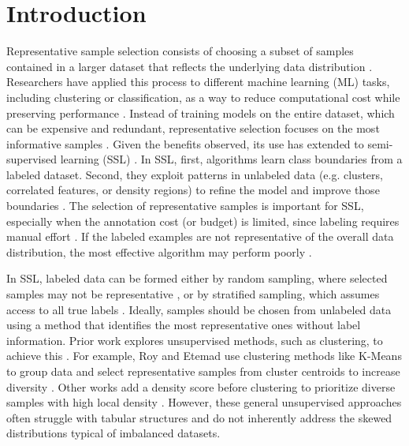 \documentclass[preprint,12pt]{elsarticle}
\begin{document}


\section{Introduction}

Representative sample selection consists of choosing a subset of samples contained in a larger dataset that reflects the underlying data distribution \cite{liebman2015representative}. Researchers have applied this process to different machine learning (ML) tasks, including clustering or classification, as a way to reduce computational cost while preserving performance \cite{olvera2010review,chen2025fpsmix}. Instead of training models on the entire dataset, which can be expensive and redundant, representative selection focuses on the most informative samples \cite{olvera2010review}. Given the benefits observed, its use has extended to semi-supervised learning (SSL) \cite{wang2022unsupervised,roy2024impact}. In SSL, first, algorithms learn class boundaries from a labeled dataset. Second, {\color{blue}they} exploit patterns in unlabeled data (e.g. clusters, correlated features, or density regions) to refine the model and improve those boundaries \cite{van2020survey,cai2023review}. The selection of representative samples is important for SSL, especially when the annotation cost (or budget) is limited, since labeling requires manual effort \cite{you2020self,singh2024shifting}. If the labeled examples are not representative of the overall data distribution, the most effective algorithm may perform poorly \cite{singh2024shifting}. 

In SSL, labeled data can be formed either by random sampling, where selected samples may not be representative \cite{berthelot2019remixmatch}, or by stratified sampling, which assumes access to all true labels \cite{wang2022debiased}. Ideally, samples should be chosen from unlabeled data using a method that identifies the most representative ones without label information. Prior work explores unsupervised methods, such as clustering, to achieve this \cite{wang2022unsupervised}. For example, Roy and Etemad use clustering methods like K-Means to group data and select representative samples from cluster centroids to increase diversity \cite{roy2024impact}. Other works add a density score before clustering to prioritize diverse samples with high local density \cite{wang2022unsupervised,wang2025resampling}. However, these general unsupervised approaches often struggle with tabular structures and do not inherently address the skewed distributions typical of imbalanced datasets.
\end{document}
